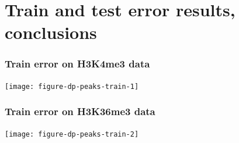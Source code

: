\documentclass{beamer}
\begin{document}

\section{Train and test error results, conclusions}

\begin{frame}
  \frametitle{Train error on H3K4me3 data}
  \texttt{[image: figure-dp-peaks-train-1]}
\end{frame}

\begin{frame}
  \frametitle{Train error on H3K36me3 data}
  \texttt{[image: figure-dp-peaks-train-2]}
\end{frame}
\end{document}
